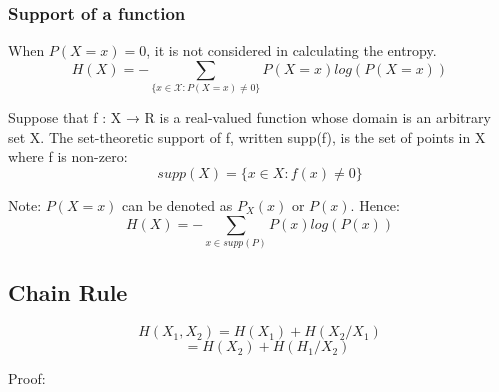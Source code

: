 \documentclass{article}
\begin{document}
\subsubsection{Support of a function}

When $P(X=x)=0$, it is not considered in calculating the entropy.
$$ H(X)=-\sum_{ \{ x \in \mathcal{X} : P(X=x) \neq 0\} } P(X=x)log(P(X=x))$$

Suppose that f : X → R is a real-valued function whose domain is an arbitrary set X. The set-theoretic support of f, written supp(f), is the set of points in X where f is non-zero:
$$ supp(X)=\{ x \in X : f(x) \neq 0 \}$$

Note: $P(X=x)$ can be denoted as $P_X(x)$ or $P(x)$. Hence:
$$ H(X)= -\sum_{x \in supp(P)} P(x)log(P(x))$$

\subsection{Chain Rule}
$$ H(X_1,X_2)=H(X_1)+H(X_2/X_1)$$
$$\quad = H(X_2)+ H(H_1/X_2)$$

Proof: 
\end{document}
